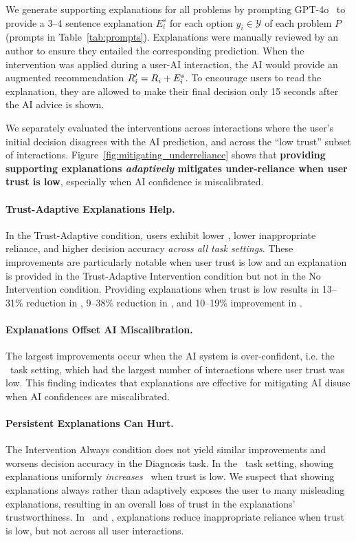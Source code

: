We generate supporting explanations for all problems by prompting GPT-4o~\cite{hurst2024gpt} to provide a 3--4 sentence explanation $E^s_i$ for each option $y_i \in \mathcal{Y}$ of each problem $P$ (prompts in Table~\ref{tab:prompts}). 
Explanations were manually reviewed by an author to ensure they entailed the corresponding prediction.
When the intervention was applied during a user-AI interaction, the AI would provide an augmented recommendation $R'_i = R_i + E^s_i$. 
To encourage users to read the explanation, they are allowed to make their final decision only 15 seconds after the AI advice is shown.

We separately evaluated the interventions across interactions where the user's initial decision disagrees with the AI prediction, and across the ``low trust'' subset of interactions. 
Figure~\ref{fig:mitigating_underreliance} shows that \textbf{providing supporting explanations \emph{adaptively} mitigates under-reliance when user trust is low}, especially when AI confidence is miscalibrated.

\paragraph{Trust-Adaptive Explanations Help.}
In the Trust-Adaptive condition, users exhibit lower \underreliance, lower inappropriate reliance, and higher decision accuracy \emph{across all task settings}. 
These improvements are particularly notable when user trust is low and an explanation is provided in the Trust-Adaptive Intervention condition but not in the No Intervention condition. 
Providing explanations when trust is low results in 13--31\% reduction in \underreliance, 9--38\% reduction in \totalinapprel, and 10--19\% improvement in \finalacc.

\paragraph{Explanations Offset AI Miscalibration.} 
The largest improvements occur when the AI system is over-confident, i.e. the \arco\ task setting, which had the largest number of interactions where user trust was low. 
This finding indicates that explanations are effective for mitigating AI disuse when AI confidences are miscalibrated.

\paragraph{Persistent Explanations Can Hurt.} 
The Intervention Always condition does not yield similar improvements and worsens decision accuracy in the Diagnosis task. 
In the \arcc\ task setting, showing explanations uniformly \emph{increases} \underreliance\ when trust is low. 
We suspect that showing explanations always rather than adaptively exposes the user to many misleading explanations, resulting in an overall loss of trust in the explanations' trustworthiness. 
In \arco\ and \diagc, explanations reduce inappropriate reliance when trust is low, but not across all user interactions.


